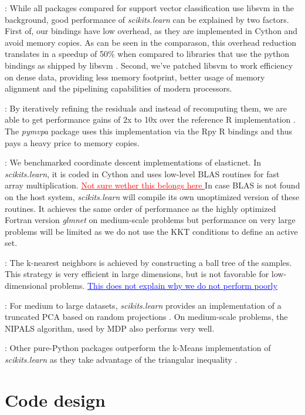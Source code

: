 \documentclass[twoside,11pt]{article}
\newcommand{\GAEL}[1]{\textcolor{blue}{\uline{#1}}}
\newcommand{\FABIAN}[1]{\textcolor{red}{\uline{#1}}}
\begin{document}
:
%
While all packages compared for support vector classification use libsvm
\citep{chang2001} in the background, good performance of
\emph{scikits.learn} can be explained by two factors. First of, our
bindings have low overhead, as they are implemented in Cython and avoid
memory copies. As can be seen in the comparason, this overhead reduction 
translates in a speedup of 50\% when compared to libraries that use the 
python bindings as shipped by libsvm \citep{chang2001}.
Second, we've patched libsvm to work efficiency on dense data, providing
less memory footprint, better usage of memory alignment and the
pipelining capabilities of modern processors.


:
By iteratively refining the residuals and instead of recomputing them,
we are able to get performance gains of 2x to 10x over the reference R
implementation \citep{LARS}. The {\sl pymvpa} package uses this
implementation via the Rpy R bindings and thus pays a heavy price to
memory copies.


:
%
We benchmarked coordinate descent implementations of elasticnet.  In
\emph{scikits.learn}, it is coded in Cython and uses low-level BLAS
routines for fast array multiplication. \FABIAN{Not sure wether this
  belongs here }In case BLAS is not found on the host system,
\emph{scikits.learn} will compile its own unoptimized version of these
routines.  It achieves the same order of performance as the highly
optimized Fortran version \emph{glmnet} \citep{friedman2010} on
medium-scale problems but performance on very large problems will be
limited as we do not use the KKT conditions to define an active set.

:
%
The k-nearest neighbors is achieved by constructing a ball
tree \citep{omohundro1989} of the samples. This strategy is very
efficient in large dimensions, but is not favorable for low-dimensional
problems. \GAEL{This does not explain why we do not perform poorly}

:
%
For medium to large datasets, \emph{scikits.learn} provides an
implementation of a truncated PCA based on random projections
\citep{rokhlin2009}. On medium-scale problems, the NIPALS algorithm, used
by MDP also performs very well.

:
%
Other pure-Python packages outperform the k-Means implementation of
\emph{scikits.learn} as they take advantage of the triangular inequality
\citep{elkan2003}.

\section{Code design}
\end{document}
